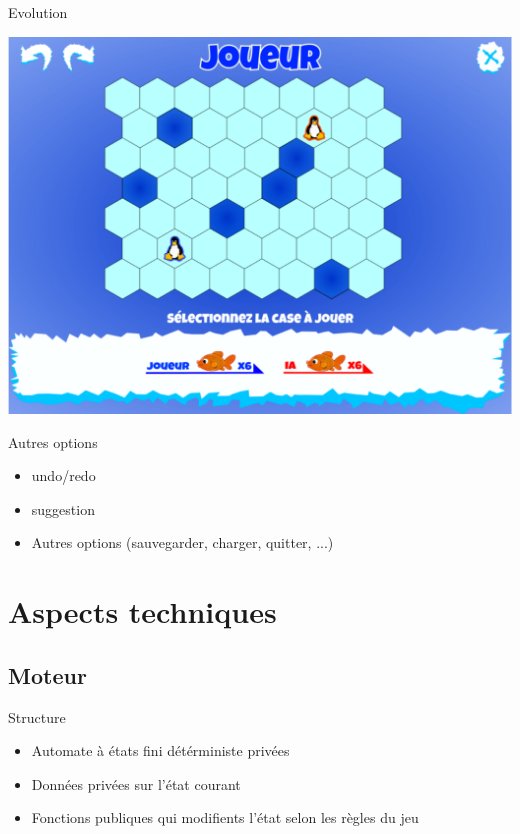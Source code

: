 \documentclass{beamer}
\begin{document}
\begin{frame}{Evolution}
    \begin{center}
      \includegraphics[scale=0.25]{ancienPlateau}
    \end{center}
\end{frame}

\begin{frame}{}
  \begin{block}{Autres options}
    \begin{itemize}
    \item <1-> undo/redo
    \item <2-> suggestion
    \item <3-> Autres options (sauvegarder, charger, quitter, ...)
    \end{itemize}
  \end{block}
\end{frame}

\section{Aspects techniques}


\subsection{Moteur}

\begin{frame}{Structure}
\begin{block}{}
\begin{itemize}
\item<1-> Automate à états fini détérministe privées
\item<2-> Données privées sur l'état courant
\item<3-> Fonctions publiques qui modifients l'état selon les règles du jeu
\end{itemize}
\end{block}
\end{frame}
\end{document}
